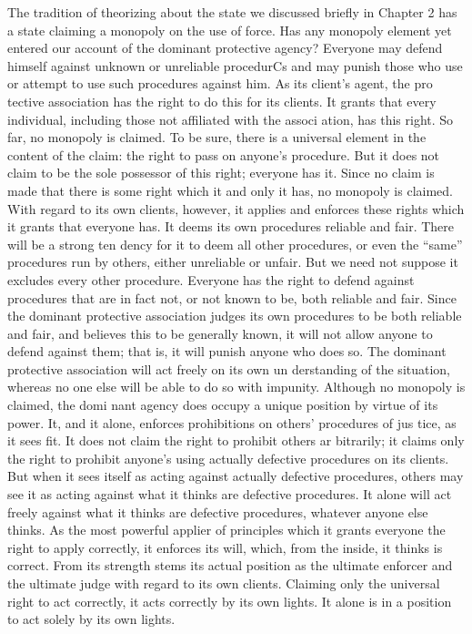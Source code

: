 \documentclass[11pt,openany]{book}
\begin{document}
The tradition of theorizing about the state we discussed briefly in Chapter 2 has a state claiming a monopoly on the use of force. Has any monopoly element yet entered our account of the dominant protective agency? Everyone may defend himself against unknown or unreliable procedurCs and may punish those who use or attempt to use such procedures against him. As its client's agent, the pro tective association has the right to do this for its clients. It grants that every individual, including those not affiliated with the associ ation, has this right. So far, no monopoly is claimed. To be sure, there is a universal element in the content of the claim: the right to pass on anyone's procedure. But it does not claim to be the sole possessor of this right; everyone has it. Since no claim is made that there is some right which it and only it has, no monopoly is claimed. With regard to its own clients, however, it applies and enforces these rights which it grants that everyone has. It deems its own procedures reliable and fair. There will be a strong ten dency for it to deem all other procedures, or even the ``same'' procedures run by others, either unreliable or unfair. But we need not suppose it excludes every other procedure. Everyone has the right to defend against procedures that are in fact not, or not known to be, both reliable and fair. Since the dominant protective association judges its own procedures to be both reliable and fair, and believes this to be generally known, it will not allow anyone to defend against them; that is, it will punish anyone who does so. The dominant protective association will act freely on its own un derstanding of the situation, whereas no one else will be able to do so with impunity. Although no monopoly is claimed, the domi nant agency does occupy a unique position by virtue of its power. It, and it alone, enforces prohibitions on others' procedures of jus tice, as it sees fit. It does not claim the right to prohibit others ar bitrarily; it claims only the right to prohibit anyone's using actually defective procedures on its clients. But when it sees itself as acting against actually defective procedures, others may see it as acting against what it thinks are defective procedures. It alone will act freely against what it thinks are defective procedures, whatever anyone else thinks. As the most powerful applier of principles which it grants everyone the right to apply correctly, it enforces its will, which, from the inside, it thinks is correct. From its strength stems its actual position as the ultimate enforcer and the ultimate judge with regard to its own clients. Claiming only the universal right to act correctly, it acts correctly by its own lights. It alone is in a position to act solely by its own lights. 
\end{document}
